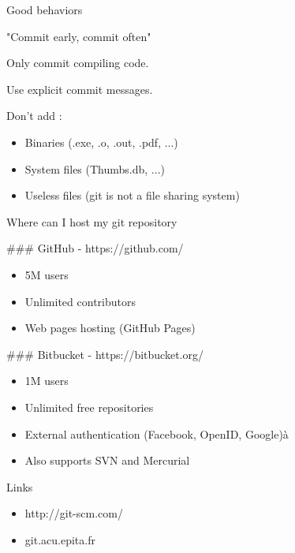 \begin{frame}
\begin{center}{\large Good behaviors}\end{center}

  "Commit early, commit often"

  Only commit compiling code.

  Use explicit commit messages.

  Don't add :
  \begin{itemize}
    \item Binaries (.exe, .o, .out, .pdf, ...)
    \item System files (Thumbs.db, ...)
    \item Useless files (git is not a file sharing system)
  \end{itemize}

\end{frame}
\begin{frame}
\begin{center}{\large Where can I host my git repository}\end{center}

  \#\#\# GitHub - https://github.com/

  \begin{itemize}
    \item 5M users
    \item Unlimited contributors
    \item Web pages hosting (GitHub Pages)
  \end{itemize}

  \#\#\# Bitbucket - https://bitbucket.org/

  \begin{itemize}
    \item 1M users
    \item Unlimited free repositories
    \item External authentication (Facebook, OpenID, Google)à
    \item Also supports SVN and Mercurial
  \end{itemize}

\end{frame}
\begin{frame}
\begin{center}{\large Links}\end{center}

  \begin{itemize}
    \item http://git-scm.com/
    \item git.acu.epita.fr
  \end{itemize}

\end{frame}
